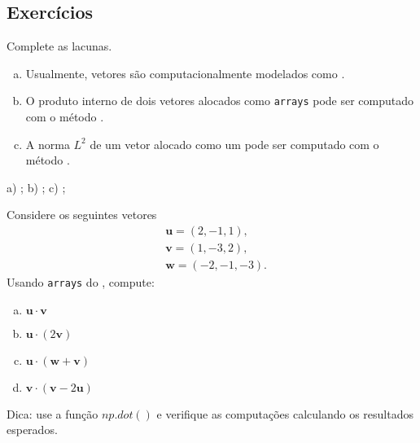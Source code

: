 \subsection{Exercícios}


\begin{exer}
  Complete as lacunas.
  \begin{enumerate}[a)]
    \item Usualmente, vetores são computacionalmente modelados como {\PYTHONnumpyDOTarray}.
    \item O produto interno de dois vetores alocados como \texttt{arrays} pode ser computado com o método \underline{\phantom{\PYTHONnumpyDOTdot}}.
    \item A norma $L^2$ de um vetor alocado como um {\PYTHONnumpyDOTarray} pode ser computado com o método \underline{\phantom{\PYTHONnumpyDOTlinalgDOTnorm}}.
  \end{enumerate}
\end{exer}
\begin{resp}
  a) {\PYTHONnumpyDOTarray}; b) {\PYTHONnumpyDOTdot}; c) {\PYTHONnumpyDOTlinalgDOTnorm};
\end{resp}


\begin{exer}
  Considere os seguintes vetores
  \begin{align}
    & \pmb{u} = (2, -1, 1), \\
    & \pmb{v} = (1, -3, 2), \\
    & \pmb{w} = (-2, -1, -3).
  \end{align}
  Usando \texttt{arrays} do {\numpy}, compute:
  \begin{enumerate}[a)]
  \item $\pmb{u}\cdot\pmb{v}$
  \item $\pmb{u}\cdot (2\pmb{v})$
  \item $\pmb{u}\cdot (\pmb{w} + \pmb{v})$
  \item $\pmb{v}\cdot (\pmb{v} - 2\pmb{u})$
  \end{enumerate}
\end{exer}
\begin{resp}
  Dica: use a função $np.dot()$ e verifique as computações calculando os resultados esperados.
\end{resp}

